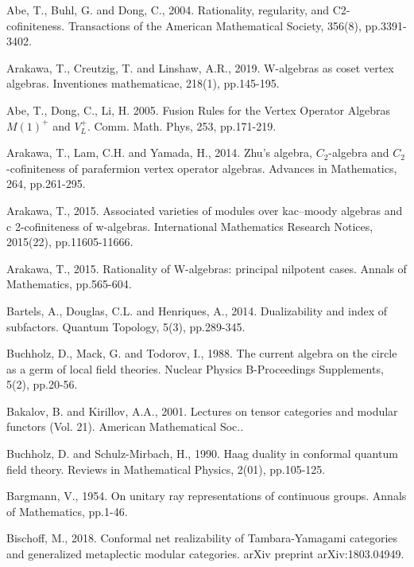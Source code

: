 \documentclass[12pt,a4paper]{article}
\theoremstyle{definition}
\theoremstyle{plain}
\numberwithin{equation}{subsection}
\begin{document}
\begin{thebibliography}{999999}
\footnotesize	

Abe, T., Buhl, G. and Dong, C., 2004. Rationality, regularity, and C2-cofiniteness. Transactions of the American Mathematical Society, 356(8), pp.3391-3402.


Arakawa, T., Creutzig, T. and Linshaw, A.R., 2019. W-algebras as coset vertex algebras. Inventiones mathematicae, 218(1), pp.145-195.

Abe, T., Dong, C.,  Li, H. 2005.  Fusion Rules for the Vertex Operator Algebras $M(1)^+$ and $V_L^+$. Comm. Math. Phys, 253, pp.171-219.


Arakawa, T., Lam, C.H. and Yamada, H., 2014. Zhu's algebra, $C_2$-algebra and $C_2$-cofiniteness of parafermion vertex operator algebras. Advances in Mathematics, 264, pp.261-295.

Arakawa, T., 2015. Associated varieties of modules over kac–moody algebras and c 2-cofiniteness of w-algebras. International Mathematics Research Notices, 2015(22), pp.11605-11666.

Arakawa, T., 2015. Rationality of W-algebras: principal nilpotent cases. Annals of Mathematics, pp.565-604.

Bartels, A., Douglas, C.L. and Henriques, A., 2014. Dualizability and index of subfactors. Quantum Topology, 5(3), pp.289-345.

Buchholz, D., Mack, G. and Todorov, I., 1988. The current algebra on the circle as a germ of local field theories. Nuclear Physics B-Proceedings Supplements, 5(2), pp.20-56.

Bakalov, B. and Kirillov, A.A., 2001. Lectures on tensor categories and modular functors (Vol. 21). American Mathematical Soc..

Buchholz, D. and Schulz-Mirbach, H., 1990. Haag duality in conformal quantum field theory. Reviews in Mathematical Physics, 2(01), pp.105-125.

Bargmann, V., 1954. On unitary ray representations of continuous groups. Annals of Mathematics, pp.1-46.

Bischoff, M., 2018. Conformal net realizability of Tambara-Yamagami categories and generalized metaplectic modular categories. arXiv preprint arXiv:1803.04949.


\end{thebibliography}
\end{document}
